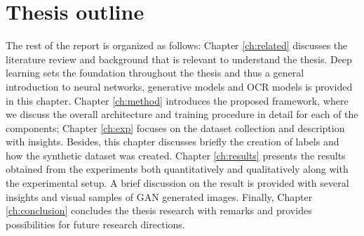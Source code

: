 \section{Thesis outline}

		The rest of the report is organized as follows:
Chapter \ref{ch:related} discusses the literature review and background that is relevant to understand the thesis. Deep learning sets the foundation throughout the thesis and thus a general introduction to neural networks, generative models and OCR models is provided in this chapter. Chapter \ref{ch:method} introduces the proposed framework, where we discuss the overall architecture and training procedure in detail for each of the components; Chapter \ref{ch:exp} focuses on the dataset collection and description with insights. Besides, this chapter discusses briefly the creation of labels and how the synthetic dataset was created. Chapter \ref{ch:results} presents the results obtained from the experiments both quantitatively and qualitatively along with the experimental setup. A brief discussion on the result is provided with several insights and visual samples of GAN generated images. Finally, Chapter \ref{ch:conclusion} concludes the thesis research with remarks and provides possibilities for future research directions.



